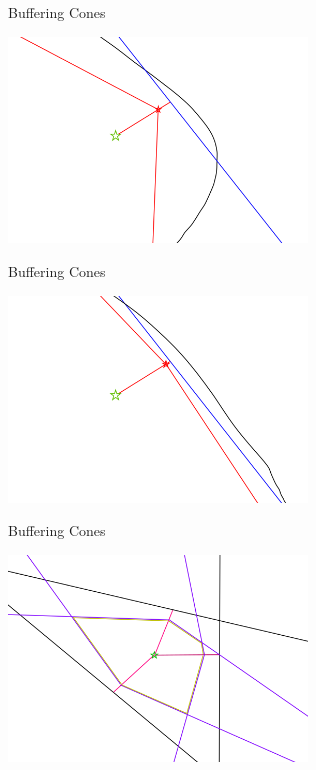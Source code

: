 \documentclass{beamer}
\begin{document}
\begin{frame}{Buffering Cones}
	\begin{center}
		\includegraphics[width=300px]{images/explanation_2.png}
	\end{center}
\end{frame}


\begin{frame}{Buffering Cones}
	\begin{center}
		\includegraphics[width=300px]{images/explanation_3.png}
	\end{center}
\end{frame}


\begin{frame}{Buffering Cones}
	\begin{center}
		\includegraphics[width=300px]{images/completed_1.png}
	\end{center}
\end{frame}
\end{document}
